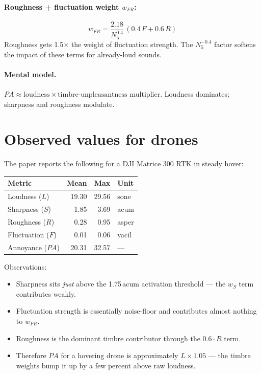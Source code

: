 \documentclass[11pt,a4paper]{article}
\begin{document}
\paragraph{Roughness + fluctuation weight \boldmath$w_{FR}$:}
\[
  w_{FR} = \frac{2.18}{N_5^{0.4}}\,(0.4\,F + 0.6\,R)
\]
Roughness gets 1.5$\times$ the weight of fluctuation strength. The $N_5^{-0.4}$ factor
softens the impact of these terms for already-loud sounds.

\paragraph{Mental model.}
$PA \approx \text{loudness} \times \text{timbre-unpleasantness multiplier}$. Loudness
dominates; sharpness and roughness modulate.

\section{Observed values for drones}

The paper reports the following for a DJI Matrice 300 RTK in steady hover:

\begin{center}
\begin{tabular}{lrrl}
  \toprule
  Metric & Mean & Max & Unit \\
  \midrule
  Loudness ($L$)        & 19.30 & 29.56 & sone   \\
  Sharpness ($S$)       & 1.85  & 3.69  & acum   \\
  Roughness ($R$)       & 0.28  & 0.95  & asper  \\
  Fluctuation ($F$)     & 0.01  & 0.06  & vacil  \\
  Annoyance ($PA$)      & 20.31 & 32.57 & ---    \\
  \bottomrule
\end{tabular}
\end{center}

\noindent
Observations:
\begin{itemize}
  \item Sharpness sits \emph{just} above the 1.75\,acum activation threshold ---
        the $w_S$ term contributes weakly.
  \item Fluctuation strength is essentially noise-floor and contributes
        almost nothing to $w_{FR}$.
  \item Roughness is the dominant timbre contributor through the $0.6 \cdot R$ term.
  \item Therefore $PA$ for a hovering drone is approximately $L \times 1.05$ ---
        the timbre weights bump it up by a few percent above raw loudness.
\end{itemize}
\end{document}
